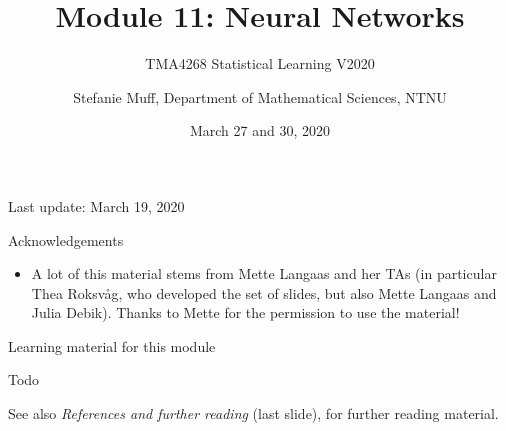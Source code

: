 \documentclass[10pt,ignorenonframetext,]{beamer}
\title{Module 11: Neural Networks}
\subtitle{TMA4268 Statistical Learning V2020}
\author{Stefanie Muff, Department of Mathematical Sciences, NTNU}
\date{March 27 and 30, 2020}
\providecommand{\tightlist}{%
  \setlength{\itemsep}{0pt}\setlength{\parskip}{0pt}}
\begin{document}
\frame{\titlepage}

\begin{frame}

Last update: March 19, 2020

\end{frame}

\begin{frame}{Acknowledgements}
\protect\hypertarget{acknowledgements}{}

\begin{itemize}
\tightlist
\item
  A lot of this material stems from Mette Langaas and her TAs (in
  particular Thea Roksv\aa g, who developed the set of slides, but also
  Mette Langaas and Julia Debik). Thanks to Mette for the permission to
  use the material!
\end{itemize}

\end{frame}

\begin{frame}

\begin{block}{Learning material for this module}

Todo

\vspace{2mm}

See also \emph{References and further reading} (last slide), for further
reading material.

\end{block}

\end{frame}
\end{document}

